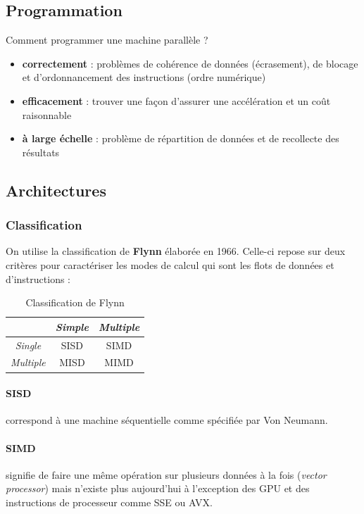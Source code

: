 \documentclass[12pt, a4paper]{article}
\begin{document}
    \subsection{Programmation}
      Comment programmer une machine parallèle ?
      \begin{itemize}
        \item \textbf{correctement} : problèmes de cohérence de données
        (écrasement), de blocage et d'ordonnancement des instructions (ordre
        numérique)
        \item \textbf{efficacement} : trouver une façon d'assurer une
        accélération et un coût raisonnable
        \item \textbf{à large échelle} : problème de répartition de données et
        de recollecte des résultats
      \end{itemize}
    \subsection{Architectures}
      \subsubsection{Classification}
        On utilise la classification de \textbf{Flynn} élaborée en 1966.
        Celle-ci repose sur deux critères pour caractériser les modes de calcul
        qui sont les flots de données et d'instructions :
        \begin{table}[h!]
          \centering
          \begin{tabular}{| c c c |}
            \hline
            & \textit{Simple} & \textit{Multiple} \\
            \hline
            \textit{Single} & SISD & SIMD \\
            \hline
            \textit{Multiple} & MISD & MIMD \\
            \hline
          \end{tabular}
          \caption{Classification de Flynn}
          \label{table:1}
        \end{table}
        \paragraph{SISD}
          correspond à une machine séquentielle comme spécifiée par Von Neumann.
        \paragraph{SIMD}
          signifie de faire une même opération sur plusieurs données à la fois
          (\textit{vector processor}) mais n'existe plus aujourd'hui à
          l'exception des GPU et des instructions de processeur comme SSE ou
          AVX.
\end{document}
